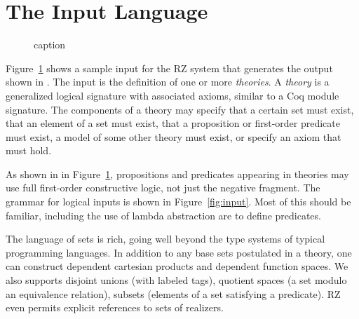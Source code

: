 \newcommand{\iprod}[3]{#1{:}#2\times#3}
\newcommand{\isums}[2]{#1+\cdots+\,#2}
\newcommand{\iquot}[2]{#1{\bigm/} #2}
\newcommand{\isubset}[3]{\{\,#1{:}#2\ |\ #3\,\}}


\section{The Input Language}
\label{sec:input-language}

\begin{figure}[htbp]
	\caption{caption}
	\label{fig:typicalinput}
\end{figure}

Figure~\ref{fig:typicalinput} shows a sample input for the RZ system that
generates the output shown in . The input is the
definition of one or more \emph{theories}. A \emph{theory} is a generalized
logical signature with associated axioms, similar to a Coq module signature.
The components of a theory may specify that a certain set must exist, that an
element of a set must exist, that a proposition or first-order predicate must
exist, a model of some other theory must exist, or specify an axiom that must
hold.


As shown in in Figure~\ref{fig:typicalinput}, propositions and predicates
appearing in theories may use full first-order constructive logic, not just the
negative fragment. The grammar for logical inputs is shown in
Figure~\ref{fig:input}. Most of this should be familiar, including the use of
lambda abstraction are to define predicates.

The language of sets is rich, going well beyond the type systems of typical
programming languages. In addition to any base sets postulated in a theory, one
can construct dependent cartesian products and dependent function spaces. We
also supports disjoint unions (with labeled tags), quotient spaces (a set
modulo an equivalence relation), subsets (elements of a set satisfying a
predicate). RZ even permits explicit references to sets of realizers.

